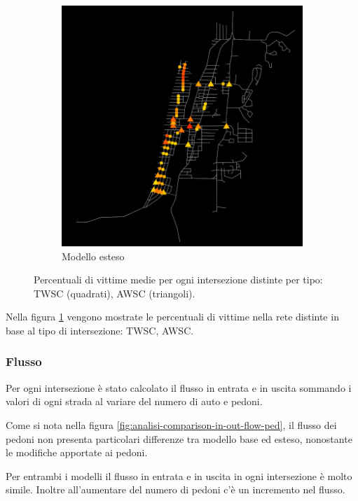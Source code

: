 \begin{figure}[ht]
\begin{subfigure}{0.475\textwidth}
        \includegraphics[width=\textwidth]{images/analisi/new_critical_ints_map.png}
        \caption{Modello esteso}
    \end{subfigure}
    \caption{Percentuali di vittime medie per ogni intersezione distinte per tipo: TWSC (quadrati), AWSC (triangoli).}
    \label{fig:analisi-comparison-critical-ints2}
\end{figure}

Nella figura \ref{fig:analisi-comparison-critical-ints2} vengono mostrate le percentuali di vittime nella rete
distinte in base al tipo di intersezione: TWSC, AWSC.


\subsubsection*{Flusso}
Per ogni intersezione è stato calcolato il flusso in entrata e in uscita sommando i valori di ogni strada al variare del numero di auto e pedoni.

Come si nota nella figura \ref{fig:analisi-comparison-in-out-flow-ped},
il flusso dei pedoni non presenta particolari differenze tra modello base ed esteso, nonostante le modifiche apportate ai pedoni.

Per entrambi i modelli il flusso in entrata e in uscita in ogni intersezione è molto simile.
Inoltre all'aumentare del numero di pedoni c'è un incremento nel flusso.

